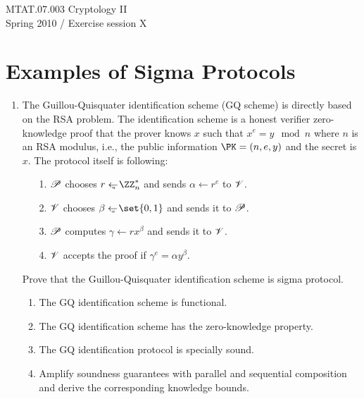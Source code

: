 \documentclass{article}
\begin{document}
\noindent	
MTAT.07.003 Cryptology II\\
Spring 2010 / Exercise session X


\section*{Examples of Sigma Protocols}

\begin{enumerate}

\item The Guillou-Quisquater identification scheme (GQ scheme) is
  directly based on the RSA problem. The identification scheme is a
  honest verifier zero-knowledge proof that the prover knows $x$ such
  that $x^e=y\mod n$ where $n$ is an RSA modulus, i.e., the public
  information $\PK=(n,e,y)$ and the secret is $x$. The protocol itself
  is following:
  \begin{enumerate}
  \item[1.] $\mathscr{P}$ chooses $r\getsu\ZZ_n^*$ and sends $\alpha\gets r^e$ to $\mathscr{V}$.
  \item[2.] $\mathscr{V}$ chooses $\beta\getsu\set{0,1}$ and sends it to $\mathscr{P}$.
  \item[3.] $\mathscr{P}$ computes $\gamma\gets r x^\beta$ and sends it to $\mathscr{V}$.
  \item[4.] $\mathscr{V}$ accepts the proof if $\gamma^e=\alpha y^\beta$.    
  \end{enumerate}
  Prove that the Guillou-Quisquater identification scheme is sigma
  protocol.
  \begin{enumerate}
  \item The GQ identification scheme is functional.
  \item The GQ identification scheme has the zero-knowledge property.
  \item The GQ identification protocol is specially sound. 
  \item Amplify soundness guarantees with parallel and sequential
    composition and derive the corresponding knowledge bounds.
  \end{enumerate}


\end{enumerate}
\end{document}
